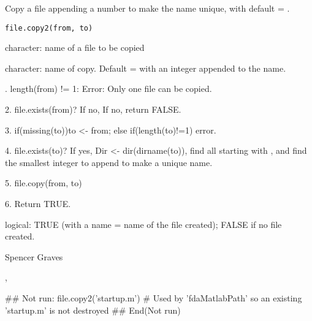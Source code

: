 \documentclass{article}
\begin{document}
\begin{Description}\relax
Copy a file appending a number to make the  name unique, with
default  = .
\end{Description}
\begin{Usage}
\begin{verbatim}
file.copy2(from, to) 
\end{verbatim}
\end{Usage}
\begin{Arguments}
\begin{ldescription}
\item[\code{from}] character:  name of a file to be copied 
\item[\code{to}] character:  name of copy.  Default =  with an integer
appended to the name.  

\end{ldescription}
\end{Arguments}
\begin{Details}.  length(from) != 1:  Error:  Only one file can be copied.  

2.  file.exists(from)?  If no, If no, return FALSE.

3.  if(missing(to))to <- from;  else if(length(to)!=1) error.

4.  file.exists(to)?  If yes, Dir <- dir(dirname(to)), find all
 starting with , and find the smallest integer to
append to make a unique  name.  

5.  file.copy(from, to)

6.  Return TRUE.
\end{Details}
\begin{Value}
logical:  TRUE (with a name = name of the file created);  FALSE if no
file created.
\end{Value}
\begin{Author}\relax
Spencer Graves
\end{Author}
\begin{SeeAlso}\relax
{},
\end{SeeAlso}
\begin{Examples}
\begin{ExampleCode}
## Not run: 
file.copy2('startup.m')
# Used by 'fdaMatlabPath' so an existing 'startup.m' is not destroyed
## End(Not run)
\end{ExampleCode}
\end{Examples}
\end{document}
